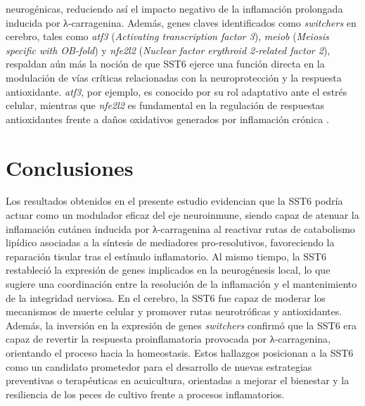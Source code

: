 \documentclass[10pt,a4paper]{article}
\begin{document}
neurogénicas, reduciendo así el impacto negativo de la inflamación prolongada inducida por λ-carragenina. Además, genes claves identificados como \textit{switchers} en cerebro, tales como \textit{atf3} (\textit{Activating transcription factor 3}), \textit{meiob} (\textit{Meiosis specific with OB-fold}) y \textit{nfe2l2} (\textit{Nuclear factor erythroid 2-related factor 2}), respaldan aún más la noción de que SST6 ejerce una función directa en la modulación de vías críticas relacionadas con la neuroprotección y la respuesta antioxidante. \textit{atf3}, por ejemplo, es conocido por su rol adaptativo ante el estrés celular, mientras que \textit{nfe2l2} es fundamental en la regulación de respuestas antioxidantes frente a daños oxidativos generados por inflamación crónica \parencite{Brown2008}.

\section{Conclusiones}
Los resultados obtenidos en el presente estudio evidencian que la SST6 podría actuar como un modulador eficaz del eje neuroinmune, siendo capaz de atenuar la inflamación cutánea inducida por λ-carragenina al reactivar rutas de catabolismo lipídico asociadas a la síntesis de mediadores pro-resolutivos, favoreciendo la reparación tisular tras el estímulo inflamatorio. Al mismo tiempo, la SST6 restableció la expresión de genes implicados en la neurogénesis local, lo que sugiere una coordinación entre la resolución de la inflamación y el mantenimiento de la integridad nerviosa. En el cerebro, la SST6 fue capaz de moderar los mecanismos de muerte celular y promover rutas neurotróficas y antioxidantes. Además, la inversión en la expresión de genes \textit{switchers} confirmó que la SST6 era capaz de revertir la respuesta proinflamatoria provocada por λ-carragenina, orientando el proceso hacia la homeostasis. Estos hallazgos posicionan a la SST6 como un candidato prometedor para el desarrollo de nuevas estrategias preventivas o terapéuticas en acuicultura, orientadas a mejorar el bienestar y la resiliencia de los peces de cultivo frente a procesos inflamatorios.

\end{document}

